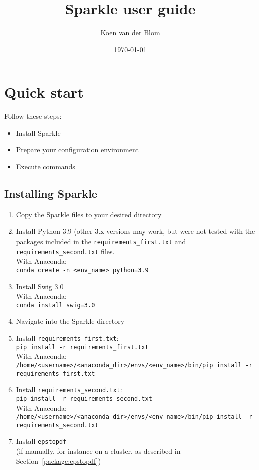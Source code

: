 \documentclass{article}
\title{Sparkle user guide}
\author{Koen van der Blom}
\date{\today}
\begin{document}
\maketitle

\section{Quick start}

Follow these steps:

\begin{itemize}
  \item[\ref{quick:install}] Install Sparkle
  \item[\ref{quick:config_environment}] Prepare your configuration environment
  \item[\ref{quick:execute_commands}] Execute commands
\end{itemize}

\subsection{Installing Sparkle}
\label{quick:install}

\begin{enumerate}

  \item Copy the Sparkle files to your desired directory
  \item Install Python 3.9 (other 3.x versions may work, but were not tested with the packages included in the \texttt{requirements\_first.txt} and \texttt{requirements\_second.txt} files.\\
        With Anaconda:\\
        \texttt{conda create -n <env\_name> python=3.9}
  \item Install Swig 3.0\\
        With Anaconda:\\
        \texttt{conda install swig=3.0}
	\item Navigate into the Sparkle directory
  \item Install \texttt{requirements\_first.txt}:\\
        \texttt{pip install -r requirements\_first.txt}\\
        With Anaconda:\\
        \texttt{/home/<username>/<anaconda\_dir>/envs/<env\_name>/bin/pip install -r requirements\_first.txt}
  \item Install \texttt{requirements\_second.txt}:\\
        \texttt{pip install -r requirements\_second.txt}\\
        With Anaconda:\\
        \texttt{/home/<username>/<anaconda\_dir>/envs/<env\_name>/bin/pip install -r requirements\_second.txt}
  \item Install \texttt{epstopdf}\\
        (if manually, for instance on a cluster, as described in Section~\ref{package:epstopdf})
\end{enumerate}
\end{document}
